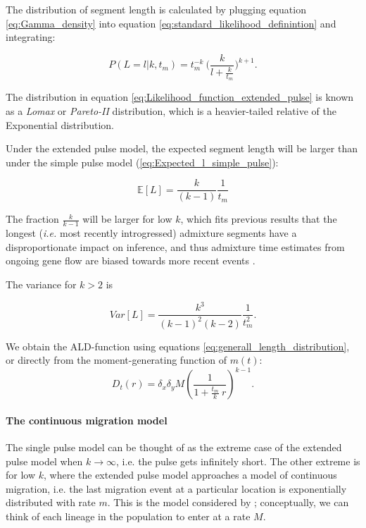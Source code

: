 \documentclass[11pt]{article}
\let\oldparagraph\paragraph
\renewcommand{\paragraph}[1]{\oldparagraph{#1}\mbox{}}
\begin{document}
	
The distribution of segment length is calculated by plugging equation \ref{eq:Gamma_density} into  equation  \ref{eq:standard_likelihood_definintion} and integrating:
	
	
\begin{equation}
\label{eq:Likelihood_function_extended_pulse}
	P(L=l | k, t_m) = t_{m}^{-k} \ \Bigg( \frac{k}{l+\frac{k}{t_{m}}}\Bigg)^{k+1}
	\text{.}
\end{equation}
	
The distribution  in equation \ref{eq:Likelihood_function_extended_pulse} is known as a \emph{Lomax} or \emph{Pareto-II} distribution, which is a heavier-tailed relative of the Exponential distribution. 
	
	
Under the extended pulse model, the expected segment length will be larger than under the simple pulse model (\ref{eq:Expected_l_simple_pulse}):
	
\begin{equation}
\label{eq:Expected_l_extended_pulse}
    \mathbb{E}[L] = \frac{k}{(k-1)}\frac{1}{t_{m}}
\end{equation}
	
The fraction $\frac{k}{k-1}$ will be larger for low $k$, which fits previous results that the longest (\emph{i.e.} most recently introgressed) admixture segments have a disproportionate impact on inference, and thus  admixture time estimates from ongoing gene flow are biased towards more recent events \citep{moorjani_history_2011,moorjani_genetic_2016}.
	
The variance for $k>2$ is 
	
\begin{equation}
\label{eq:Var_l_extended_pulse}
	Var[L] = \frac{k^3}{(k-1)^2 (k-2)} \frac{1}{t_m^2}\text{.}
\end{equation}
	
We obtain the ALD-function using equations \ref{eq:generall_length_distribution}, or directly from the moment-generating function of $m(t)$:
\begin{equation}
\label{eq:extended_pulse_tail}
D_t(r) = \delta_x\delta_y M\left( \frac{1}{1 + \frac{t_m}{k} \:r}\right) ^{k-1} \text{.}
\end{equation}

	
\paragraph{The continuous migration model}

The single pulse model can be thought of as the extreme case of the extended pulse model when $k \to \infty$, i.e. the pulse gets infinitely short. The other extreme is for low $k$, where the extended pulse model approaches a model of continuous migration, i.e. the last migration event at a particular location is exponentially distributed with rate $m$. This is the model considered by \cite{pool_inference_2009}; conceptually, we can think of each lineage in the population to enter at a rate $M$. 
	
\end{document}
